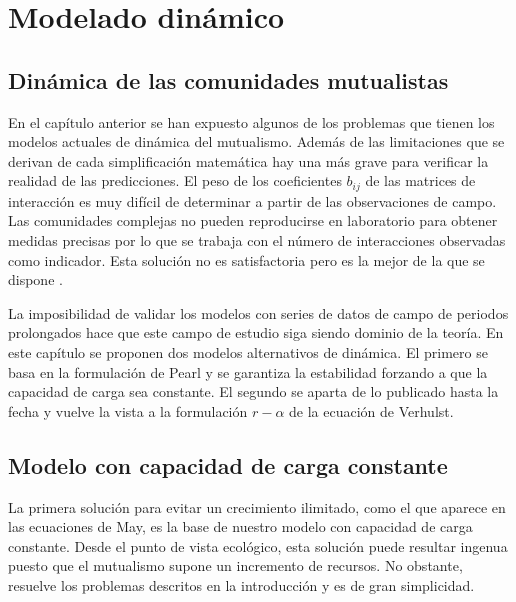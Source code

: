 
\chapter{Modelado dinámico} %

\label{chapterDINAMICA} %


\section{Dinámica de las comunidades mutualistas}

En el capítulo anterior se han expuesto algunos de los problemas que tienen los modelos actuales de dinámica del mutualismo. Además de las limitaciones que se derivan de cada simplificación matemática hay una más grave para verificar la realidad de las predicciones. El peso de los coeficientes $b_{ij}$ de las matrices de interacción es muy difícil de determinar a partir de las observaciones de campo. Las comunidades complejas no pueden reproducirse en laboratorio para obtener medidas precisas por lo que se trabaja con el número de interacciones observadas como indicador. Esta solución no es satisfactoria pero es la mejor de la que se dispone \cite{olesen2002geographic}. 

La imposibilidad de validar los modelos con series de datos de campo de periodos prolongados hace que este campo de estudio siga siendo dominio de la teoría. En este capítulo se proponen dos modelos alternativos de dinámica. El primero se basa en la formulación de Pearl y se garantiza la estabilidad forzando a que la capacidad de carga sea constante. El segundo se aparta de lo publicado hasta la fecha y vuelve la vista a la formulación $r-\alpha$ de la ecuación de Verhulst.

\section{Modelo con capacidad de carga constante}

La primera solución para evitar un crecimiento ilimitado, como el que aparece en las ecuaciones de May, es la base de nuestro modelo con capacidad de carga constante. Desde el punto de vista ecológico, esta solución puede resultar ingenua puesto que el mutualismo supone un incremento de recursos. No obstante, resuelve los problemas descritos en la introducción y es de gran simplicidad.

